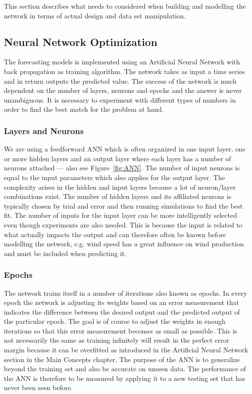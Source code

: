 This section describes what needs to considered when building and modelling the network in terms of actual design and data set manipulation.

\subsection{Neural Network Optimization}
The forecasting models is implemented using an Artificial Neural Network with back propagation as training algorithm. The network takes as input a time series and in return outputs the predicted value. The success of the network is much dependent on the number of layers, neurons and epochs and the answer is never unambiguous. It is necessary to experiment with different types of numbers in order to find the best match for the problem at hand.

\subsubsection{Layers and Neurons}
We are using a feedforward ANN which is often organized in one input layer, one or more hidden layers and an output layer where each layer has a number of neurons attached\cite{1} --- also see Figure~\ref{fig:ANN}. The number of input neurons is equal to the input parameters which also applies for the output layer. 
The complexity arises in the hidden and input layers because a lot of neuron/layer combinations exist. The number of hidden layers and its affiliated neurons is typically chosen by trial and error and then running simulations to find the best fit\cite{1}. The number of inputs for the input layer can be more intelligently selected even though experiments are also needed. This is because the input is related to what actually impacts the output and can therefore often be known before modelling the network, e.g. wind speed has a great influence on wind production and must be included when predicting it.

\subsubsection{Epochs}
The network trains itself in a number of iterations also known as epochs. In every epoch the network is adjusting its weights based on an error measurement that indicates the difference between the desired output and the predicted output of the particular epoch\cite{1}. The goal is of course to adjust the weights in enough iterations so that this error measurement becomes as small as possible. This is not necessarily the same as training infinitely will result in the perfect error margin because it can be overfitted as introduced in the Artificial Neural Network section in the Main Concepts chapter. The purpose of the ANN is to generalize beyond the training set and also be accurate on unseen data\cite{1}. The performance of the ANN is therefore to be measured by applying it to a new testing set that has never been seen before.

